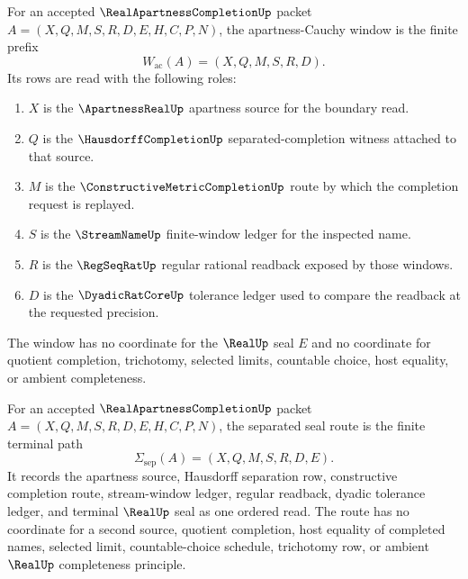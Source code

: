 \begin{definition}
\label{def:real-apartness-completion-apartness-cauchy-window}
For an accepted $\RealApartnessCompletionUp$ packet $A=(X,Q,M,S,R,D,E,H,C,P,N)$, the apartness-Cauchy window is the finite prefix
$$
W_{\mathrm{ac}}(A)=(X,Q,M,S,R,D).
$$
Its rows are read with the following roles:
\begin{enumerate}
\item $X$ is the $\ApartnessRealUp$ apartness source for the boundary read.
\item $Q$ is the $\HausdorffCompletionUp$ separated-completion witness attached to that source.
\item $M$ is the $\ConstructiveMetricCompletionUp$ route by which the completion request is replayed.
\item $S$ is the $\StreamNameUp$ finite-window ledger for the inspected name.
\item $R$ is the $\RegSeqRatUp$ regular rational readback exposed by those windows.
\item $D$ is the $\DyadicRatCoreUp$ tolerance ledger used to compare the readback at the requested precision.
\end{enumerate}
The window has no coordinate for the $\RealUp$ seal $E$ and no coordinate for quotient completion, trichotomy, selected limits, countable choice, host equality, or ambient completeness.
\end{definition}

\begin{definition}
\label{def:real-apartness-completion-separated-seal-route}
For an accepted $\RealApartnessCompletionUp$ packet $A=(X,Q,M,S,R,D,E,H,C,P,N)$, the separated seal route is the finite terminal path
$$
\Sigma_{\mathrm{sep}}(A)=(X,Q,M,S,R,D,E).
$$
It records the apartness source, Hausdorff separation row, constructive completion route, stream-window ledger, regular readback, dyadic tolerance ledger, and terminal $\RealUp$ seal as one ordered read. The route has no coordinate for a second source, quotient completion, host equality of completed names, selected limit, countable-choice schedule, trichotomy row, or ambient $\RealUp$ completeness principle.
\end{definition}

